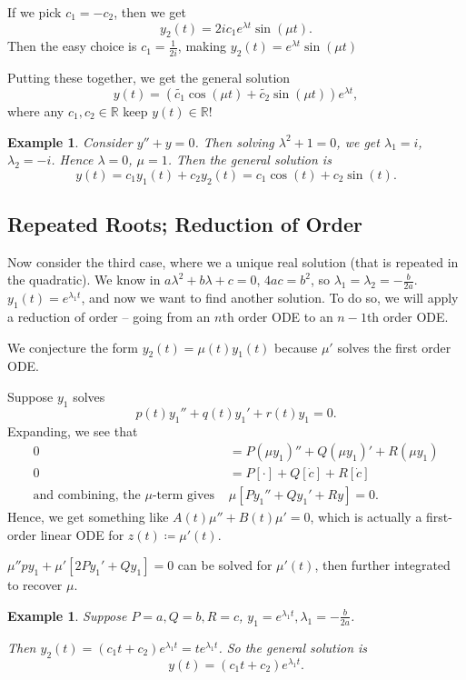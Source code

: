 \documentclass{tufte-handout}
\newcommand*\R{\mathbb{R}}
\newtheorem{ex}[thm]{Example}
\theoremstyle{definition}
\begin{document}
If we pick $c_1 = -c_2$, then we get \[
	y_2(t) = 2i c_1 e^{\lambda t} \sin{(\mu t)}
.\] Then the easy choice is $c_1 = \frac{1}{2i}$, making $y_2(t) = e^{\lambda t} \sin{(\mu t)}$

Putting these together, we get the general solution \[
	y(t) = \left(\tilde{c_1} \cos{(\mu t)} + \tilde{c_2} \sin{(\mu t)}\right) e^{\lambda t}
,\] where any $c_1,c_2 \in \R$ keep $y(t) \in \R$!

\begin{ex}
	Consider $y'' + y = 0$. Then solving $\lambda^2 + 1 = 0$, we get $\lambda_1 = i$, $\lambda_2 = -i$. Hence $\lambda = 0$, $\mu = 1$. Then the general solution is 
	\[
		y(t) = c_1 y_1(t) + c_2 y_2(t) = c_1 \cos{(t)} + c_2 \sin{(t)}
	.\] 
\end{ex}

\subsection{Repeated Roots; Reduction of Order}

Now consider the third case, where we a unique real solution (that is repeated in the quadratic).
We know in $a \lambda^2 + b\lambda  +c = 0$, $4ac = b^2$, so $\lambda_1 = \lambda_2 = -\frac{b}{2a}$. $y_1(t) = e^{\lambda_1 t}$, and now we want to find another solution. To do so, we will apply a reduction of order -- going from an $n$th order ODE to an $n-1$th order ODE.

We conjecture the form $y_2(t) = \mu(t) y_1(t)$ because $\mu'$ solves the first order ODE.

Suppose $y_1$ solves \[
	p(t) y_1'' + q(t) y_1' + r(t)y_1 = 0
.\] Expanding, we see that
\begin{align*}
	0 &= P (\mu y_1)'' + Q (\mu y_1)' + R(\mu y_1) \\
	0 &= P \left[ \cdot \right] + Q \left[ \dot{c} \right] + R \left[ \dot{c} \right] \\
	\text{and combining, the $\mu$-term gives } &\mu \left[ Py_1'' + Qy_1'  + Ry \right] = 0
.\end{align*}
Hence, we get something like $A(t)\mu'' + B(t) \mu' = 0$, which is actually a first-order linear ODE for $z(t) \coloneqq \mu'(t)$.

$\mu'' p y_1 + \mu' \left[ 2Py_1' + Qy_1 \right] =0$ can be solved for $\mu'(t)$, then further integrated to recover $\mu$.

\begin{ex}
	Suppose $P = a, Q = b, R = c$, $y_1 = e^{\lambda_1 t}, \lambda_1 = -\frac{b}{2a}$.

	Then $y_2(t) = (c_1t + c_2) e^{\lambda_1 t} = t e^{\lambda_1 t}$.
	So the general solution is \[
		y(t) = \left( c_1 t + c_2\right) e^{\lambda_1 t}
	.\] 
\end{ex}
\end{document}
